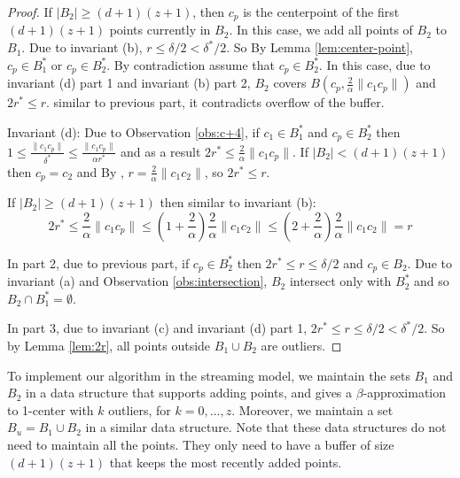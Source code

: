 \documentclass[envcountsame]{cls/cccg15}
\newcommand{\dz}{(d + 1)(z + 1)}
\newcommand{\len}[1]{\|{#1}\|}
\newcommand{\radius}[1]{\frac{2}{\alpha} \len{c_1 #1}}
\newcommand{\lee}{\leqslant}
\newcommand{\gee}{\geqslant}
\renewcommand{\leq}{\lee}
\renewcommand{\geq}{\gee}
\renewcommand{\ge}{\gee}
\begin{document}
\begin{proof}
If $|B_2| \geq \dz$, then $c_p$ is the centerpoint of the first $\dz$ points currently in $B_2$. 
In this case, we add all points of $B_2$ to $B_1$. Due to invariant (b), $r \leq \delta/2 < \delta^*/2$. 
So By Lemma \ref{lem:center-point}, $c_p \in B_1^*$ or $c_p \in B_2^*$. By contradiction assume that $c_p \in B_2^*$. In this case, due to invariant (d) part 1 and invariant (b) part 2, $B_2$ covers $B(c_p, \radius{c_p})$ and $2r^* \leq r$. similar to previous part, it contradicts overflow of the buffer. 

Invariant (d): 
Due to  Observation \ref{obs:c+4}, if $c_1 \in B_1^*$ and $c_p \in B_2^*$ then $1 \leq \frac{\len{c_1 c_p}}{\delta^*} \leq \frac{\len{c_1 c_p}}{\alpha r^*}$ and as a result $2r^* \leq \radius{c_p}$. If $|B_2| < \dz$ then $c_p = c_2$ and By , $r = \radius{c_2}$, so $2r^* \leq r$.

If $|B_2| \ge \dz$ then similar to invariant (b): $$2r^* \leq \radius{c_p} \leq (1 + \frac{2}{\alpha})\radius{c_2} \leq (2 + \frac{2}{\alpha})\radius{c_2} = r$$

In part 2, due to previous part, if $c_p \in B_2^*$ then $2r^* \leq r \leq \delta /2$ and $c_p \in B_2$. Due to invariant (a) and Observation \ref{obs:intersection}, $B_2$ intersect only with $B_2^*$ and so $B_2 \cap B_1^* = \emptyset$.

In part 3, due to invariant (c) and invariant (d) part 1, $2r^* \leq r \leq \delta/2 < \delta^* /2$. So by Lemma \ref{lem:2r}, all points outside $B_1 \cup B_2$ are outliers.

\end{proof}

To implement our algorithm in the streaming model,
we maintain the sets $B_1$ and $B_2$ 
in a data structure that supports adding points,
and gives a $\beta$-approximation to 1-center with $k$ outliers, for $k=0,\dots,z$.
Moreover, we maintain a set $B_u = B_1 \cup B_2$ in a similar data structure.
Note that these data structures do not need to maintain all the points. 
They only need to have a buffer of size $\dz$ that keeps the most recently added points.
\end{document}
